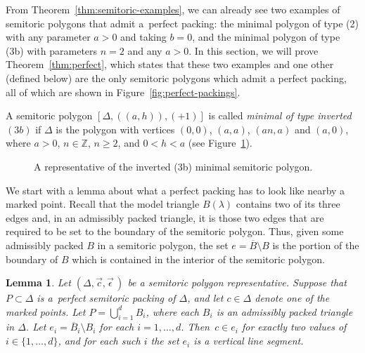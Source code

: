 \documentclass[10pt,a4paper]{amsart}
\numberwithin{equation}{section}
\newtheorem{Lemma}[Theorem]{Lemma}
\def\Z{{\mathbb Z}}
\newcommand{\De}{\Delta}
\newcommand{\strep}{(\De,\vec{c},\vec{\epsilon}\,)}
\theoremstyle{definition}
\theoremstyle{plain}
\theoremstyle{plain}
\begin{document}
From Theorem~\ref{thm:semitoric-examples}, we can already see two examples of semitoric polygons that admit a~perfect packing: the minimal polygon of type (2) with any parameter $a>0$ and taking $b=0$, and the minimal polygon of type (3b) with parameters $n=2$ and any $a>0$.
In this section, we will prove Theorem~\ref{thm:perfect}, which states that these two examples and one other (defined below) are the only semitoric polygons which admit a perfect packing, all of which are shown in Figure~\ref{fig:perfect-packings}.

\begin{Definition}\label{def:inverted-3b}
 A semitoric polygon $[\De,((a,h)),(+1)]$ is called \emph{minimal of type inverted $(3b)$} if $\De$ is the polygon with vertices $(0,0)$, $(a,a)$, $(an, a)$ and $(a,0)$,
 where $a>0$, $n\in\Z$, $n\geq 2$, and $0<h<a$ (see Figure~\ref{fig:inverted3b}).
\end{Definition}
\begin{figure}[t]
 \centering
 \caption{A representative of the inverted (3b) minimal semitoric polygon.}
 \label{fig:inverted3b}
\end{figure}


We start with a lemma about what a perfect packing has to look like nearby a marked point.
Recall that the model triangle $B(\lambda)$ contains two of its three edges and, in an admissibly packed triangle, it is those two edges that are required to be set to the boundary of the semitoric polygon. Thus, given some admissibly packed $B$ in a semitoric polygon, the set $e = \overline{B}\setminus B$ is the portion of the boundary of $B$ which is contained in the interior of the semitoric polygon.

\begin{Lemma}\label{lem:perfect-local}
 Let $\strep$ be a semitoric polygon representative.
 Suppose that $P\subset \De$ is a~perfect semitoric packing of $\De$, and let $c\in\De$ denote one of the marked points.
 Let $P = \bigcup_{i=1}^d B_i$, where each $B_i$ is an admissibly packed triangle in $\De$.
 Let $e_i = \overline{B}_i\setminus B_i$ for each $i=1,\ldots, d$.
 Then~$c\in e_i$ for exactly two values of $i\in\{1,\ldots,d\}$, and
for each such $i$ the set $e_i$ is a vertical line segment.
\end{Lemma}
\end{document}
